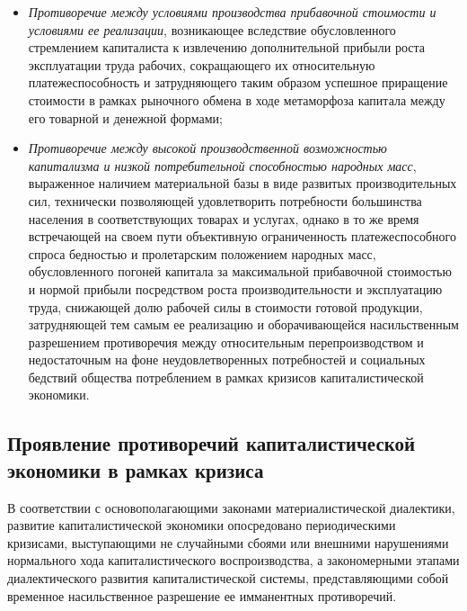 \begin{itemize}
    \item \textit{Противоречие между условиями производства прибавочной стоимости и условиями ее реализации}, возникающее вследствие обусловленного стремлением капиталиста к извлечению дополнительной прибыли роста эксплуатации труда рабочих, сокращающего их относительную платежеспособность и затрудняющего таким образом успешное приращение стоимости в рамках рыночного обмена в ходе метаморфоза капитала между его товарной и денежной формами;
    \item \textit{Противоречие между высокой производственной возможностью капитализма и низкой потребительной способностью народных масс}, выраженное наличием материальной базы в виде развитых производительных сил, технически позволяющей удовлетворить потребности большинства населения в соответствующих товарах и услугах, однако в то же время встречающей на своем пути объективную ограниченность платежеспособного спроса бедностью и пролетарским положением народных масс, обусловленного погоней капитала за максимальной прибавочной стоимостью и нормой прибыли посредством роста производительности и эксплуатацию труда, снижающей долю рабочей силы в стоимости готовой продукции, затрудняющей тем самым ее реализацию и оборачивающейся насильственным разрешением противоречия между относительным перепроизводством и недостаточным на фоне неудовлетворенных потребностей и социальных бедствий общества потреблением в рамках кризисов капиталистической экономики.
\end{itemize}

\subsection{Проявление противоречий капиталистической экономики в рамках кризиса}
В соответствии с основополагающими законами материалистической диалектики, развитие капиталистической экономики опосредовано периодическими кризисами, выступающими не случайными сбоями или внешними нарушениями нормального хода капиталистического воспроизводства, а закономерными этапами диалектического развития капиталистической системы, представляющими собой временное насильственное разрешение ее имманентных противоречий.


